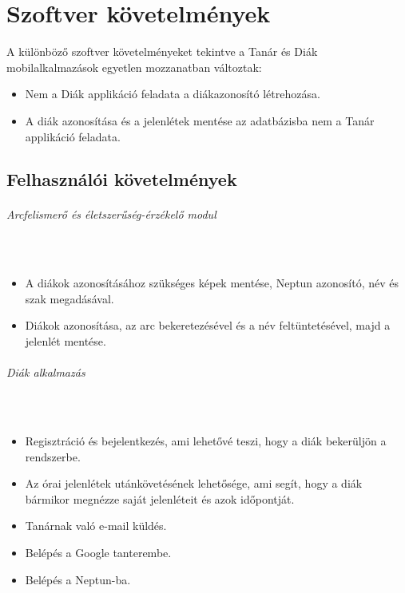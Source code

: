\chapter{Szoftver követelmények} \label{chapter6}

A különböző szoftver követelményeket tekintve a Tanár és Diák mobilalkalmazások egyetlen mozzanatban változtak: 

\begin{itemize}
    \item {Nem a Diák applikáció feladata a diákazonosító létrehozása.}
    \item {A diák azonosítása és a jelenlétek mentése az adatbázisba nem a Tanár applikáció feladata.}
\end{itemize}

\section{Felhasználói követelmények}

\subparagraph* {Arcfelismerő és életszerűség-érzékelő modul}\
\newline
\begin{itemize}
    \item {A diákok azonosításához szükséges képek mentése, Neptun azonosító, név és szak megadásával.}
    \item {Diákok azonosítása, az arc bekeretezésével és a név feltüntetésével, majd a jelenlét mentése.}
\end{itemize}

\subparagraph* {Diák alkalmazás}\
\newline
\begin{itemize}
    \item {Regisztráció és bejelentkezés, ami lehetővé teszi, hogy a diák bekerüljön a rendszerbe.}
	\item {Az órai jelenlétek utánkövetésének lehetősége, ami segít, hogy a diák bármikor megnézze saját jelenléteit és azok időpontját.}
	\item {Tanárnak való e-mail küldés.}
	\item {Belépés a Google tanterembe.}
	\item {Belépés a Neptun-ba.}\\
\end{itemize}

